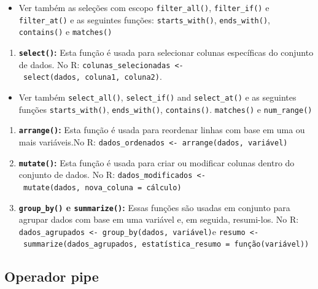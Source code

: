 \documentclass[
  letterpaper,
  DIV=11,
  numbers=noendperiod]{scrreprt}
\providecommand{\tightlist}{%
  \setlength{\itemsep}{0pt}\setlength{\parskip}{0pt}}
\begin{document}
\begin{itemize}
\tightlist
\item
  Ver também as seleções com escopo \texttt{filter\_all()},
  \texttt{filter\_if()} e \texttt{filter\_at()} e as seguintes funções:
  \texttt{starts\_with()}, \texttt{ends\_with()}, \texttt{contains()} e
  \texttt{matches()}
\end{itemize}

\begin{enumerate}
\def\labelenumi{\arabic{enumi}.}
\setcounter{enumi}{1}
\tightlist
\item
  \textbf{\texttt{select()}:} Esta função é usada para selecionar
  colunas específicas do conjunto de dados. No R:
  \texttt{colunas\_selecionadas\ \textless{}-\ select(dados,\ coluna1,\ coluna2)}.
\end{enumerate}

\begin{itemize}
\tightlist
\item
  Ver também \texttt{select\_all()}, \texttt{select\_if()} and
  \texttt{select\_at()} e as seguintes funções \texttt{starts\_with()},
  \texttt{ends\_with()}, \texttt{contains()}. \texttt{matches()} e
  \texttt{num\_range()}
\end{itemize}

\begin{enumerate}
\def\labelenumi{\arabic{enumi}.}
\setcounter{enumi}{1}
\item
  \textbf{\texttt{arrange()}:} Esta função é usada para reordenar linhas
  com base em uma ou mais variáveis.No R:
  \texttt{dados\_ordenados\ \textless{}-\ arrange(dados,\ variável)}
\item
  \textbf{\texttt{mutate()}:} Esta função é usada para criar ou
  modificar colunas dentro do conjunto de dados. No R:
  \texttt{dados\_modificados\ \textless{}-\ mutate(dados,\ nova\_coluna\ =\ cálculo)}
\item
  \textbf{\texttt{group\_by()} e \texttt{summarize()}:} Essas funções
  são usadas em conjunto para agrupar dados com base em uma variável e,
  em seguida, resumi-los. No R:
  \texttt{dados\_agrupados\ \textless{}-\ group\_by(dados,\ variável)}e
  \texttt{resumo\ \textless{}-\ summarize(dados\_agrupados,\ estatística\_resumo\ =\ função(variável))}
\end{enumerate}

\subsection{Operador pipe}\label{operador-pipe}
\end{document}
